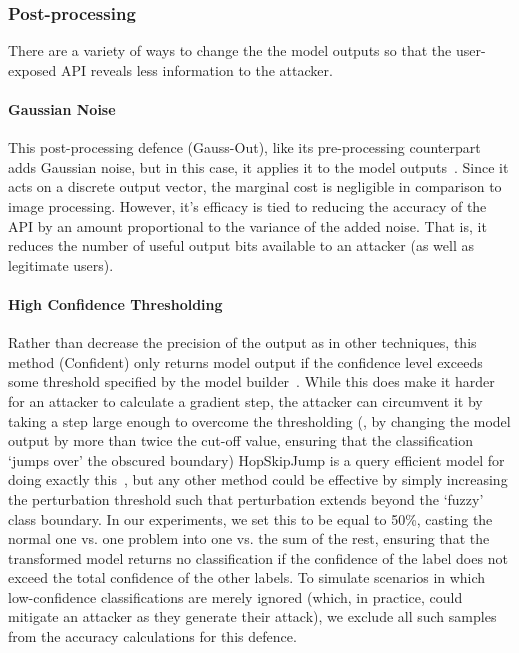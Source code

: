 \subsubsection{Post-processing}
\label{post-processing}

There are a variety of ways to change the the model outputs so that the user-exposed API reveals less information to the attacker.

\paragraph{Gaussian Noise}
This post-processing defence (Gauss-Out), like its pre-processing counterpart adds Gaussian noise, but in this case, it applies it to the model outputs~\cite{gauss_out}.
Since it acts on a discrete output vector, the marginal cost is negligible in comparison to image processing.
However, it's efficacy is tied to reducing the accuracy of the API by an amount proportional to the variance of the added noise.
That is, it reduces the number of useful output bits available to an attacker (as well as legitimate users).

\paragraph{High Confidence Thresholding}
Rather than decrease the precision of the output as in other techniques, this method (Confident) only returns model output if the confidence level exceeds some threshold specified by the model builder~\cite{high_conf}.
While this does make it harder for an attacker to calculate a gradient step, the attacker can circumvent it by taking a step large enough to overcome the thresholding (\ie, by changing the model output by more than twice the cut-off value, ensuring that the classification `jumps over' the obscured boundary) HopSkipJump is a query efficient model for doing exactly this~\cite{hopskipjump}, but any other method could be effective by simply increasing the perturbation threshold such that perturbation extends beyond the `fuzzy' class boundary.
In our experiments, we set this to be equal to 50\%, casting the normal one vs.
one problem into one vs.
the sum of the rest, ensuring that the transformed model returns no classification if the confidence of the label does not exceed the total confidence of the other labels.
To simulate scenarios in which low-confidence classifications are merely ignored (which, in practice, could mitigate an attacker as they generate their attack), we exclude all such samples from the accuracy calculations for this defence.

